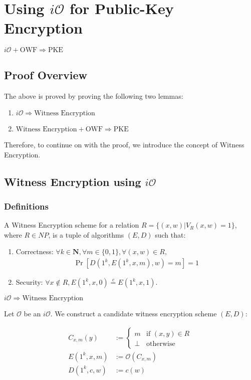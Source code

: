 \documentclass{article}
\newcommand{\N}{{\mathbf N}}
\newcommand{\ci}{\stackrel{c}{=}}
\newcommand{\io}{i\mathcal{O}}
\begin{document}
\section{Using $\io$ for Public-Key Encryption}

    $\io + \text{OWF} \Rightarrow \text{PKE}$

\subsection{Proof Overview}
The above is proved by proving the following two lemmas:
    \begin{enumerate}
        \item $\io \Rightarrow \text{Witness Encryption}$
        \item $\text{Witness Encryption} + \text{OWF} \Rightarrow\text{PKE}$
    \end{enumerate}
Therefore, to continue on with the proof, we introduce the concept of Witness Encryption.
\subsection{Witness Encryption using $\io$}
    \subsubsection{Definitions}
    A Witness Encryption scheme for a relation $R = \{(x, w) | V_R(x, w) = 1\}$, where $R \in NP$, is a tuple of algorithms $(E, D)$ such that:
        \begin{enumerate}
            \item Correctness: $\forall k \in\N, \forall{m}\in\{0, 1\},\forall{(x, w)}\in R,$
                \begin{align*}
                    \Pr[D(1^k, E(1^k, x, m), w) = m] = 1
                \end{align*}
            \item Security: $\forall{x}\not\in R, E(1^k, x, 0) \ci E(1^k, x, 1)$.
        \end{enumerate}

$\io \Rightarrow \text{Witness Encryption}$

Let $\mathcal{O}$ be an $\io$. We construct a candidate witness encryption scheme $(E, D)$:

\begin{align*}
    C_{x,m}(y) &:= \left\{\begin{array}{cc}
                                m& \text{if $(x, y) \in R$} \\
                                \bot& \text{otherwise}
                            \end{array}\right. \\
    E(1^k, x, m) &:= \mathcal{O}(C_{x, m}) \\
    D(1^k, c, w) &:= c(w)
\end{align*}
\end{document}
